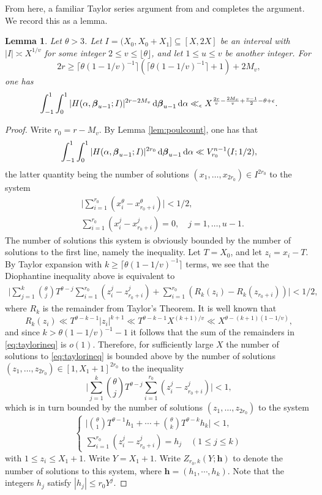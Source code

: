 \documentclass[11pt,reqno]{amsart}
\newtheorem{lemma}{Lemma}[section]
\numberwithin{equation}{section}
\renewcommand{\d}{\,{\rm d}}
\begin{document}
From here, a familiar Taylor series argument from \cite{ArkhZhit} and \cite{Poulias1} completes the argument. 
We record this as a lemma. 

\begin{lemma} \label{lem:taylor}
Let $\theta > 3$. Let $I = (X_0,X_0+X_1] \subseteq [X,2X]$ be an interval with $|I| \asymp X^{1/v}$ for some integer $ 2 \leq v \leq \lfloor \theta \rfloor$, and let $1 \leq u \leq v$ be  another integer. For 
\[ 2r \geq \lceil \theta(1-1/v)^{-1} \rceil(\lceil \theta(1-1/v)^{-1} \rceil+1)+2M_v, \] 
one has 
\[ \int_{-1}^1 \int_0^1 |H(\alpha, \boldsymbol{\beta}_{u-1};I)|^{2r-2M_v} \d\boldsymbol{\beta}_{u-1}\d\alpha \ll_{\epsilon} X^{\frac{2r}{v}-\frac{2M_v}{v}+\frac{v-1}{2}-\theta+\epsilon}.  \]
\end{lemma}

\begin{proof} Write $r_0 = r-M_v$. By Lemma \ref{lem:poulcount}, one has that 
\[ \int_{-1}^1 \int_0^1 |H(\alpha, \boldsymbol{\beta}_{u-1};I)|^{2r_0} \d\boldsymbol{\beta}_{u-1}\d\alpha \ll V_{r_0}^{n-1}(I;1/2), \]
the latter quantity being the number of solutions $(x_1,\ldots,x_{2r_0}) \in I^{2r_0} $ to the system 
\begin{align*} 
& \Big| \sum_{i=1}^{r_0} (x_i^{\theta} -x_{r_0+i}^{\theta}) \Big| < 1/2, 
\\ 
& \sum_{i=1}^{r_0} (x_i^j-x_{r_0+i}^j) = 0, \quad j= 1, \ldots, u-1.
\end{align*}
The number of solutions this system is obviously bounded by the number of solutions to the first line, namely the inequality. Let $T = X_0$, and let $z_i = x_i-T$. By Taylor expansion with $k \geq \lceil \theta (1-1/v)^{-1} \rceil$ terms, we see that the Diophantine inequality above is equivalent to 
\begin{align} \label{eq:taylorineq}
\Big| \sum_{j=1}^{k} \binom{\theta}{j} T^{\theta-j} \sum_{i=1}^{r_0} (z_i^j-z_{r_0+i}^j) + \sum_{i=1}^{r_0}(R_k(z_i)-R_k(z_{r_0+i})) \Big| < 1/2,
\end{align}
where $R_k$ is the remainder from Taylor's Theorem. It is well known that 
\[ R_k(z_i) \ll T^{\theta-k-1}|z_i|^{k+1} \ll T^{\theta-k-1}X^{(k+1)/v} \ll X^{\theta-(k+1)(1-1/v)}, \]
and since $k > \theta (1-1/v)^{-1}-1$ it follows that the sum of the remainders in \eqref{eq:taylorineq} is $o(1)$. Therefore, for sufficiently large $X$ the number of solutions to \eqref{eq:taylorineq} is bounded above by 
the number of solutions $(z_1,\ldots,z_{2r_0}) \in [1,X_1+1]^{2r_0}$ to the inequality 
\[ \Big| \sum_{j=1}^{k} \binom{\theta}{j} T^{\theta-j} \sum_{i=1}^{r_0} (z_i^j-z_{r_0+i}^j) \Big| < 1, \]
which is in turn bounded by the number of solutions $(z_1,\ldots,z_{2r_0})$ to the system 
\[  \begin{cases}
      \Big|\binom{\theta}{1} T^{\theta-1}h_1+\cdots+\binom{\theta}{k} T^{\theta-k}h_k| < 1,  \\
      \sum_{i=1}^{r_0} (z_i^j-z_{r_0+i}^j) = h_j \quad (1 \leq j \leq k)
    \end{cases} 
\] 
with $1 \leq z_i \leq X_1+1$. Write $Y = X_1+1$. Write $Z_{r_0,k}(Y; \mathbf{h})$ to denote the number of solutions to this system, where $\mathbf{h} = (h_1,\cdots, h_k)$. Note that the integers $h_j$ satisfy $|h_j| \leq r_0Y^{j}$. 


\end{proof}
\end{document}
